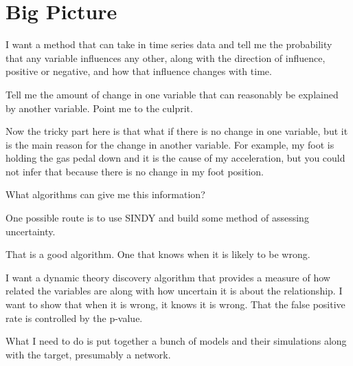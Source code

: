 \documentclass{article}
\begin{document}
        \section{Big Picture}

        I want a method that can take in time series data and tell me the probability that
        any variable influences any other, along with the direction of influence, positive
        or negative, and how that influence changes with time.

        Tell me the amount of change in one variable that can reasonably be explained by
        another variable. Point me to the culprit.

        Now the tricky part here is that what if there is no change in one variable,
        but it is the main reason for the change in another variable. For example,
        my foot is holding the gas pedal down and it is the cause of my acceleration, but
        you could not infer that because there is no change in my foot position.

        What algorithms can give me this information?

        One possible route is to use SINDY and build some method of assessing uncertainty.

        That is a good algorithm. One that knows when it is likely to be wrong.

        I want a dynamic theory discovery algorithm that provides a measure of how related 
        the variables are along with how uncertain it is about the relationship. I want
        to show that when it is wrong, it knows it is wrong. That the false positive rate 
        is controlled by the p-value.

        What I need to do is put together a bunch of models and their simulations along with
        the target, presumably a network.

    
            
\end{document}
